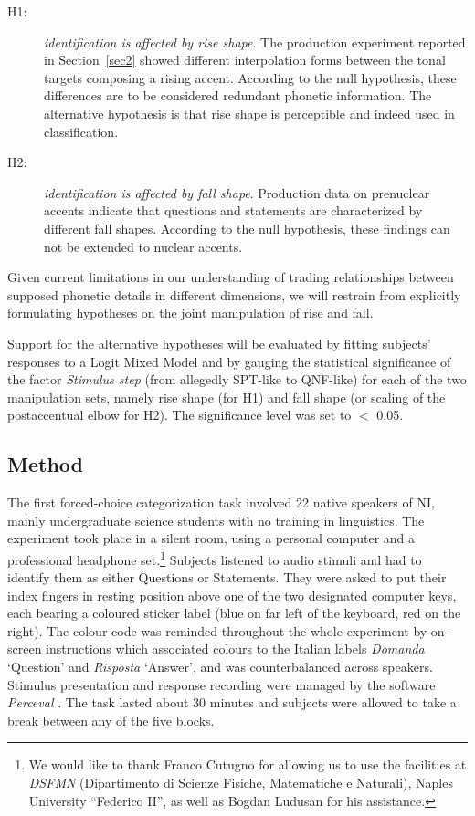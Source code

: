 \begin{description}
   \item[H1:] \textit{identification is affected by rise shape}. The production experiment reported in Section~\ref{sec2} showed different interpolation forms between the tonal targets composing a rising accent. According to the null hypothesis, these differences are to be considered redundant phonetic information. The alternative hypothesis is that rise shape is perceptible and indeed used in classification.
   \item[H2:] \textit{identification is affected by fall shape}. Production data on prenuclear accents indicate that questions and statements are characterized by different fall shapes. According to the null hypothesis, these findings can not be extended to nuclear accents.
\end{description}

Given current limitations in our understanding of trading relationships between supposed phonetic details in different dimensions, we will restrain from explicitly formulating hypotheses on the joint manipulation of rise and fall.

Support for the alternative hypotheses will be evaluated by fitting subjects' responses to a Logit Mixed Model and by gauging the statistical significance of the factor \textit{Stimulus step} (from allegedly SPT-like to QNF-like) for each of the two manipulation sets, namely rise shape (for H1) and fall shape (or scaling of the postaccentual elbow for H2). The significance level was set to $<$ 0.05.

\subsection{Method}\label{sec321}
The first forced-choice categorization task involved 22 native speakers of NI, mainly undergraduate science students with no training in linguistics. The experiment took place in a silent room, using a personal computer and a professional headphone set.\footnote{We would like to thank Franco Cutugno for allowing us to use the facilities at \textit{DSFMN} (Dipartimento di Scienze Fisiche, Matematiche e Naturali), Naples University ``Federico II'', as well as Bogdan Ludusan for his assistance.} Subjects listened to audio stimuli and had to identify them as either Questions or Statements. They were asked to put their index fingers in resting position above one of the two designated computer keys, each bearing a coloured sticker label (blue on far left of the keyboard, red on the right). The colour code was reminded throughout the whole experiment by on-screen instructions which associated colours to the Italian labels \textit{Domanda} `Question' and \textit{Risposta} `Answer', and was counterbalanced across speakers. Stimulus presentation and response recording were managed by the software \textit{Perceval} \citep{andre2003perceval}. The task lasted about 30 minutes and subjects were allowed to take a break between any of the five blocks.

